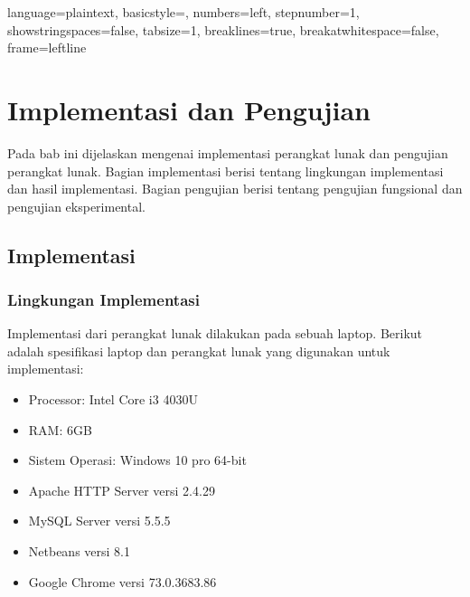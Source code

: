 

\lstset
{ 
    language=plaintext,
    basicstyle=\footnotesize,
    numbers=left,
    stepnumber=1,
    showstringspaces=false,
    tabsize=1,
    breaklines=true,
    breakatwhitespace=false,
    frame=leftline
}

\chapter{Implementasi dan Pengujian}
\label{chap:implementasidanpengujian}
Pada bab ini dijelaskan mengenai implementasi perangkat lunak dan pengujian perangkat lunak. Bagian implementasi berisi tentang lingkungan implementasi dan hasil implementasi. Bagian pengujian berisi tentang pengujian fungsional dan pengujian eksperimental. 

\section{Implementasi}
\label{sec:implementasi}
\subsection{Lingkungan Implementasi}
\label{subsec:lingkunganimplementasi5}
Implementasi dari perangkat lunak dilakukan pada sebuah laptop. Berikut adalah spesifikasi laptop dan perangkat lunak yang digunakan untuk implementasi:
\begin{itemize}
\item Processor: Intel Core i3 4030U
\item RAM: 6GB
\item Sistem Operasi: Windows 10 pro 64-bit
\item Apache HTTP Server versi 2.4.29
\item MySQL Server versi 5.5.5
\item Netbeans versi 8.1
\item Google Chrome versi 73.0.3683.86
\end{itemize}

